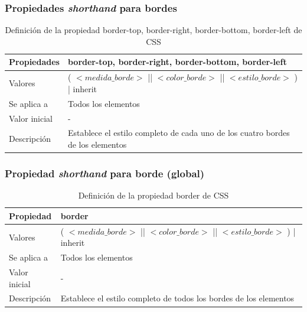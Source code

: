 
\begin{frame}
\frametitle{Propiedades \emph{shorthand} para bordes}

\begin{center}
  \begin{table}
   \begin{tabular}{p{1.8cm}p{7.8cm}}
Propiedades &\bf{border-top}, \bf{border-right}, \bf{border-bottom}, \bf{border-left} \\ \hline
Valores & ( $<medida\_borde>$ || $<color\_borde>$ || $<estilo\_borde>$ ) | inherit \\ \hline
Se aplica a & Todos los elementos \\ \hline
Valor inicial & - \\ \hline
Descripción & Establece el estilo completo de cada uno de los cuatro bordes de los elementos \\ \hline
 \end{tabular}
   \caption{Definición de la propiedad border-top, border-right, border-bottom, border-left de CSS}
 \end{table}
\end{center}

\end{frame}


\begin{frame}
\frametitle{Propiedad \emph{shorthand} para borde (global)}

\begin{center}
  \begin{table}
   \begin{tabular}{p{1.8cm}p{7.8cm}}
Propiedad &\bf{border} \\ \hline
Valores & ( $<medida\_borde>$ || $<color\_borde>$ || $<estilo\_borde>$ ) | inherit \\ \hline
Se aplica a & Todos los elementos \\ \hline
Valor inicial & - \\ \hline
Descripción & Establece el estilo completo de todos los bordes de los elementos \\ \hline
 \end{tabular}
   \caption{Definición de la propiedad border de CSS}
 \end{table}
\end{center}

\end{frame}

